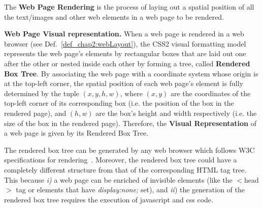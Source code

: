 \begin{definition}
\label{def_chap2:webLayout} The \textbf{ Web Page Rendering} is the process of laying out a spatial position of all the text/images and other web elements in a web page to be rendered.
\end{definition}


 
\begin{definition}
\label{def_chap2:visualRepresentation}
\textbf{Web Page Visual representation.} When a web page is rendered in a web browser (see Def.~\ref{def_chap2:webLayout}), the CSS2 visual formatting model~\cite{WiumLie99} represents the web page's elements by rectangular boxes that are laid out one after the other or nested inside each other by forming a tree, called \textbf{Rendered Box Tree}. By associating the web page with a coordinate system whose origin is at the top-left corner, the spatial position of each web page's element is fully determined by the tuple $(x,y,h,w)$, where $(x, y)$ are the coordinates of the top-left corner of its corresponding box (i.e. the position of the box in the rendered page), and $(h, w)$ are the box's height and width respectively (i.e. the size of the box in the rendered page). Therefore, the \textbf{Visual Representation} of a web page is given by its Rendered Box Tree.
\end{definition}

The rendered box tree can be generated by any web browser which follows W3C specifications for rendering~\cite{WiumLie99}. Moreover, the rendered box tree could have a completely different structure from that of the corresponding HTML tag tree. This because \emph{i) }a web page can be enriched of invisible elements (like the $<$head$>$ tag or elements that have \emph{display:none;} set), and \emph{ii}) the generation of the rendered box tree requires the execution of javascript and css code.
  
